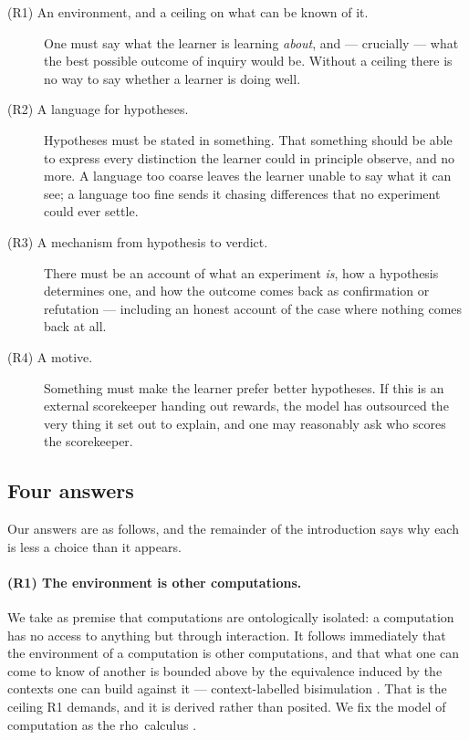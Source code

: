 \documentclass[11pt]{article}
\theoremstyle{plain}
\theoremstyle{definition}
\newcommand{\rhoc}{\textsf{rho}}
\begin{document}
\begin{description}
\item[\textnormal{(R1)} An environment, and a ceiling on what can be known of it.] One must say what
the learner is learning \emph{about}, and --- crucially --- what the best possible outcome of inquiry
would be. Without a ceiling there is no way to say whether a learner is doing well.
\item[\textnormal{(R2)} A language for hypotheses.] Hypotheses must be stated in something. That
something should be able to express every distinction the learner could in principle observe, and no
more. A language too coarse leaves the learner unable to say what it can see; a language too fine
sends it chasing differences that no experiment could ever settle.
\item[\textnormal{(R3)} A mechanism from hypothesis to verdict.] There must be an account of what an
experiment \emph{is}, how a hypothesis determines one, and how the outcome comes back as confirmation
or refutation --- including an honest account of the case where nothing comes back at all.
\item[\textnormal{(R4)} A motive.] Something must make the learner prefer better hypotheses. If this
is an external scorekeeper handing out rewards, the model has outsourced the very thing it set out to
explain, and one may reasonably ask who scores the scorekeeper.
\end{description}

\subsection{Four answers}

Our answers are as follows, and the remainder of the introduction says why each is less a choice than
it appears.

\paragraph{(R1) The environment is other computations.} We take as premise that computations are
ontologically isolated: a computation has no access to anything but through interaction. It follows
immediately that the environment of a computation is other computations, and that what one can come to
know of another is bounded above by the equivalence induced by the contexts one can build against it
--- context-labelled bisimulation \cite{Probing}. That is the ceiling R1 demands, and it is derived
rather than posited. We fix the model of computation as the \rhoc\ calculus \cite{RHO}.
\end{document}
